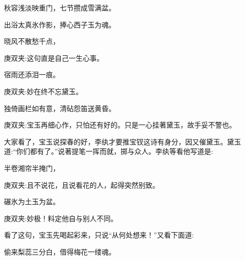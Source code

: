 \begin{poem}
    \begin{pl}秋容浅淡映重门，七节攒成雪满盆。\end{pl}

    \begin{pl}出浴太真氷作影，捧心西子玉为魂。\end{pl}

    \begin{pl}晓风不散愁千点，\end{pl}
    \begin{note}庚双夹:这句直是自己一生心事。\end{note}
    \begin{pl}宿雨还添泪一痕。\end{pl}
    \begin{note}庚双夹:妙在终不忘黛玉。\end{note}

    \begin{pl}独倚画栏如有意，清砧怨笛送黄昏。\end{pl}
    \begin{note}庚双夹:宝玉再细心作，只怕还有好的。只是一心挂著黛玉，故手妥不警也。\end{note}
\end{poem}


\begin{parag}
    大家看了，宝玉说探春的好，李纨才要推宝钗这诗有身分，因又催黛玉。黛玉道:“你们都有了。”说著提笔一挥而就，掷与众人。李纨等看他写道是:
\end{parag}


\begin{poem}
    \begin{pl}半卷湘帘半掩门，\end{pl}\begin{note}庚双夹:且不说花，且说看花的人，起得突然别致。\end{note}

    \begin{pl}碾氷为土玉为盆。\end{pl}\begin{note}庚双夹:妙极！料定他自与别人不同。\end{note}
\end{poem}


\begin{parag}
    看了这句，宝玉先喝起彩来，只说“从何处想来！”又看下面道:
\end{parag}


\begin{poem}
    \begin{pl}偷来梨蕊三分白，借得梅花一缕魂。\end{pl}
\end{poem}


